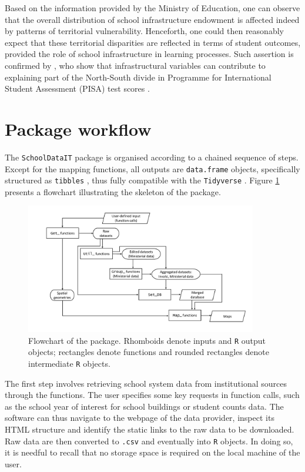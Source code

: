 \documentclass[openany]{book}
\begin{document}
Based on the information provided by the Ministry of Education, one can observe that the overall distribution of school infrastructure endowment is affected indeed by patterns of territorial vulnerability. Henceforth, one could then reasonably expect that these territorial disparities are reflected in terms of student outcomes, provided the role of school infrastructure in learning processes. Such assertion is confirmed by \cite{Bratti}, who show that infrastructural variables can contribute to explaining part of the North-South divide in Programme for International Student Assessment (PISA) test scores \citep{OECD_PISA2024}.





\section{Package workflow} \label{section:Workflow}
The \texttt{SchoolDataIT} package is organised according to a chained sequence of steps. Except for the mapping functions, all outputs are \texttt{data.frame} objects, specifically structured as \texttt{tibbles} \citep{tibble}, thus fully compatible with the \texttt{Tidyverse} \citep{tidyverse}. Figure \ref{fig:Flowchart} presents a flowchart illustrating the skeleton of the package.

\begin{figure}
  \centering
  \includegraphics[width = 0.9\textwidth]{SchoolDataIT/Fig1.pdf} 
  \caption{Flowchart of the package. Rhomboids denote inputs and \texttt{R} output objects; rectangles denote functions and rounded rectangles denote intermediate \texttt{R} objects.}
  \label{fig:Flowchart}
\end{figure}

The first step involves retrieving school system data from institutional sources through the \texttt{} functions. The user specifies some key requests in function calls, such as the school year of interest for school buildings or student counts data. The software can thus navigate to the webpage of the data provider, inspect its HTML structure and identify the static links to the raw data to be downloaded. Raw data are then converted to \texttt{.csv} and eventually into \texttt{R} objects. In doing so, it is needful to recall that no storage space is required on the local machine of the user. 
\end{document}
